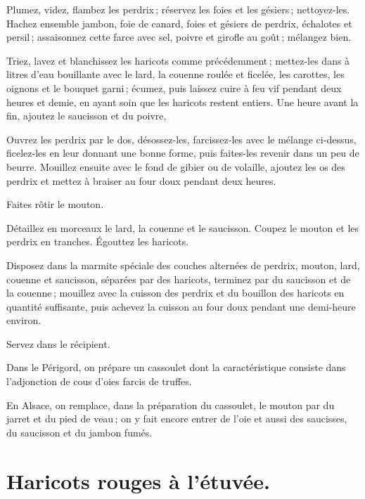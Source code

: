 Plumez, videz, flambez les perdrix ; réservez les foies et les gésiers ;
nettoyez-les. Hachez ensemble jambon, foie de canard, foies et gésiers de
perdrix, échalotes et persil ; assaisonnez cette farce avec sel, poivre et
girofle au goût ; mélangez bien.

Triez, lavez et blanchissez les haricots comme précédemment ; mettez-les dans
{\mmm} à {\mmm} litres d'eau bouillante avec le lard, la couenne
roulée et ficelée, les carottes, les oignons et le bouquet garni ; écumez, puis
laissez cuire à feu vif pendant deux heures et demie, en ayant soin que les
haricots restent entiers. Une heure avant la fin, ajoutez le saucisson et du
poivre,

Ouvrez les perdrix par le dos, désossez-les, farcissez-les avec le mélange
ci-dessus, ficelez-les en leur donnant une bonne forme, puis faites-les revenir
dans un peu de beurre. Mouillez ensuite avec le fond de gibier ou de volaille,
ajoutez les os des perdrix et mettez à braiser au four doux pendant deux
heures.

Faites rôtir le mouton.

Détaillez en morceaux le lard, la couenne et le saucisson. Coupez le mouton et
les perdrix en tranches. Égouttez les haricots.

Disposez dans la marmite spéciale des couches alternées de perdrix, mouton,
lard, couenne et saucisson, séparées par des haricots, terminez par du
saucisson et de la couenne ; mouillez avec la cuisson des perdrix et du
bouillon des haricots en quantité suffisante, puis achevez la cuisson au four
doux pendant une demi-heure environ.

Servez dans le récipient.

\sk

Dans le Périgord, on prépare un cassoulet dont la caractéristique consiste dans
l’adjonction de cous d'oies farcis de truffes.

\sk

En Alsace, on remplace, dans la préparation du cassoulet, le mouton par du
jarret et du pied de veau ; on y fait encore entrer de l'oie et aussi des
saucisses, du saucisson et du jambon fumés.

\section*{\centering Haricots rouges à l’étuvée.}
{}

